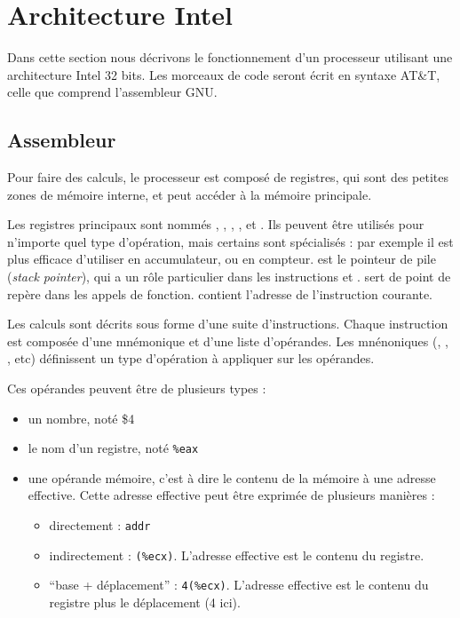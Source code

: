 \section{Architecture Intel}

Dans cette section nous décrivons le fonctionnement d'un processeur utilisant
une architecture Intel 32 bits. Les morceaux de code seront écrit en syntaxe
AT\&T, celle que comprend l'assembleur GNU.

\subsection{Assembleur}

Pour faire des calculs, le processeur est composé de registres, qui sont des
petites zones de mémoire interne, et peut accéder à la mémoire principale.

Les registres principaux sont nommés \eax, \ebx, \ecx, \edx, \esi et \edi. Ils
peuvent être utilisés pour n'importe quel type d'opération, mais certains sont
spécialisés : par exemple il est plus efficace d'utiliser \eax en accumulateur,
ou \ecx en compteur. \esp est le pointeur de pile (\emph{stack pointer}), qui a
un rôle particulier dans les instructions  et .
\ebp sert de point de repère dans les appels de fonction. \eip contient
l'adresse de l'instruction courante.

Les calculs sont décrits sous forme d'une suite d'instructions. Chaque
instruction est composée d'une mnémonique et d'une liste d'opérandes. Les
mnénoniques (, , , etc) définissent
un type d'opération à appliquer sur les opérandes.

Ces opérandes peuvent être de plusieurs types :

\begin{itemize}
\item
  un nombre, noté \$4
\item
  le nom d'un registre, noté \texttt{\%eax}
\item
  une opérande mémoire, c'est à dire le contenu de la mémoire à une
  adresse effective. Cette adresse effective peut être exprimée de
  plusieurs manières :
  \begin{itemize}
  \item
    directement : \texttt{addr}
  \item
    indirectement : \texttt{(\%ecx)}. L'adresse effective est le contenu
    du registre.
  \item
    ``base + déplacement'' : \texttt{4(\%ecx)}. L'adresse effective est
    le contenu du registre plus le déplacement (4 ici).
  \end{itemize}
\end{itemize}

